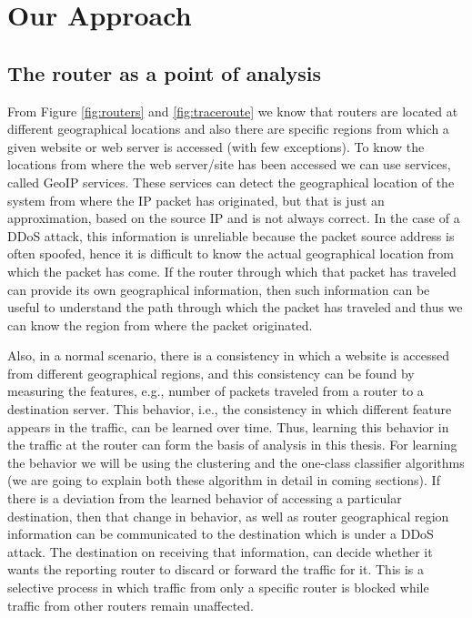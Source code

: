 \documentclass[12pt,oneside,a4paper]{article}
\begin{document}
\section{Our Approach}

\subsection{The router as a point of analysis}
From Figure \ref{fig:routers} and \ref{fig:traceroute} we know that routers are located at different geographical locations and also there are specific regions from which a given website or web server is accessed (with few exceptions). To know the locations from where the web server/site has been accessed we can use services, called GeoIP services. These services can detect the geographical location of the system from where the IP packet has originated, but that is just an approximation, based on the source IP and is not always correct. In the case of a DDoS attack, this information is unreliable because the packet source address is often spoofed, hence it is difficult to know the actual geographical location from which the packet has come. If the router through which that packet has traveled can provide its own geographical information, then such information can be useful to understand the path through which the packet has traveled and thus we can know the region from where the packet originated.\par

Also, in a normal scenario, there is a consistency in which a website is accessed from different geographical regions, and this consistency can be found by measuring the features, e.g., number of packets traveled from a router to a destination server. This behavior, i.e., the consistency in which different feature appears in the traffic, can be learned over time. Thus, learning this behavior in the traffic at the router can form the basis of analysis in this thesis. For learning the behavior we will be using the clustering and the one-class classifier algorithms (we are going to explain both these algorithm in detail in coming sections). If there is a deviation from the learned behavior of accessing a particular destination, then that change in behavior, as well as router geographical region information can be communicated to the destination which is under a DDoS attack. The destination on receiving that information, can decide whether it wants the reporting router to discard or forward the traffic for it. This is a selective process in which traffic from only a specific router is blocked while traffic from other routers remain unaffected.
\end{document}
